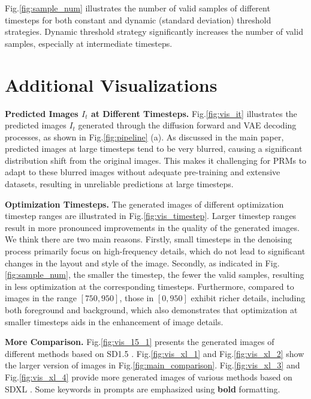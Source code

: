 Fig.\;\ref{fig:sample_num} illustrates the number of valid samples of different timesteps for both constant and dynamic (standard deviation) threshold strategies. Dynamic threshold strategy significantly increases the number of valid samples, especially at intermediate timesteps.

\section{Additional Visualizations}
\label{sec:add_vis}

\textbf{Predicted Images $I_t$ at Different Timesteps.} Fig.\;\ref{fig:vis_it} illustrates the predicted images $I_t$ generated through the diffusion forward and VAE decoding processes, as shown in Fig.\;\ref{fig:pipeline} (a). As discussed in the main paper, predicted images at large timesteps tend to be very blurred, causing a significant distribution shift from the original images. This makes it challenging for PRMs to adapt to these blurred images without adequate pre-training and extensive datasets, resulting in unreliable predictions at large timesteps.

\textbf{Optimization Timesteps.} The generated images of different optimization timestep ranges are illustrated in Fig.\;\ref{fig:vis_timestep}. Larger timestep ranges result in more pronounced improvements in the quality of the generated images. We think there are two main reasons. Firstly, small timesteps in the denoising process primarily focus on high-frequency details, which do not lead to significant changes in the layout and style of the image. Secondly, as indicated in Fig.\;\ref{fig:sample_num}, the smaller the timestep, the fewer the valid samples, resulting in less optimization at the corresponding timesteps. Furthermore, compared to images in the range $[750,950]$, those in $[0,950]$ exhibit richer details, including both foreground and background, which also demonstrates that optimization at smaller timesteps aids in the enhancement of image details.


\textbf{More Comparison.} Fig.\;\ref{fig:vis_15_1} presents the generated images of different methods based on SD1.5 \cite{sd1}. Fig.\;\ref{fig:vis_xl_1} and Fig.\;\ref{fig:vis_xl_2} show the larger version of images in Fig.\;\ref{fig:main_comparison}. Fig.\;\ref{fig:vis_xl_3} and Fig.\;\ref{fig:vis_xl_4} provide more generated images of various methods based on SDXL \cite{sdxl}. Some keywords in prompts are emphasized using \textbf{bold} formatting.

